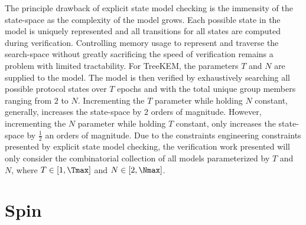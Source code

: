 The principle drawback of explicit state model checking is the immensity of the state-space as the complexity of the model grows.
Each possible state in the model is uniquely represented and all transitions for all states are computed during verification.
Controlling memory usage to represent and traverse the search-space without greatly sacrificing the speed of verification remains a problem with limited tractability.
For TreeKEM, the parameters \(T\) and \(N\) are supplied to the model.
The model is then verified by exhaustively searching all possible protocol states over \(T\) epochs and with the total unique group members ranging from \(2\) to \(N\).
Incrementing the \(T\) parameter while holding \(N\) constant, generally, increases the state-space by \(2\) orders of magnitude.
However, incrementing the \(N\) parameter while holding \(T\) constant, only increases the state-space by \(\frac{1}{2}\) an orders of magnitude.
Due to the constraints engineering constraints presented by explicit state model checking, the verification work presented will only consider the combinatorial collection of all models parameterized by \(T\) and \(N\), where \(T \in [1, \Tmax]\) and \(N \in [2, \Nmax]\).


\hypertarget{spin}{%
\section{Spin}\label{spin}}

